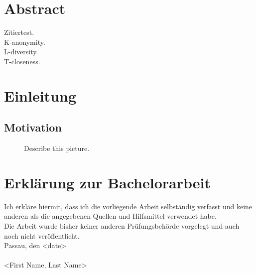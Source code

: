 \documentclass[12pt, a4paper,oneside]{report}
\begin{document}


\setcounter{tocdepth}{10}
\tableofcontents






\listoffigures
\listoftables

\titleformat{\chapter}{\LARGE\bfseries}{\thechapter}{1em}{}




\chapter*{Abstract}

Zitiertest\cite{Gerl2018}.\\
K-anonymity\cite{SWEENEY2002}.\\
L-diversity\cite{Machanavajjhala2006}.\\
T-closeness\cite{Li2007}.\\


\newpage
\chapter{Einleitung}

\section{Motivation}

\begin{figure}[!ht]
	\centering
	\caption{Describe this picture.}
	\label{fig:1}
\end{figure}










\newpage
\chapter*{Erklärung zur Bachelorarbeit}
Ich erkläre hiermit, dass ich die vorliegende Arbeit selbständig verfasst und keine anderen als die angegebenen Quellen und Hilfsmittel verwendet habe. \newline
\ \\
Die Arbeit wurde bisher keiner anderen Prüfungsbehörde vorgelegt und auch noch nicht veröffentlicht.\newline
\ \\
Passau, den <date>
\newline
\ \\
\ \\
<First Name, Last Name>
\end{document}
